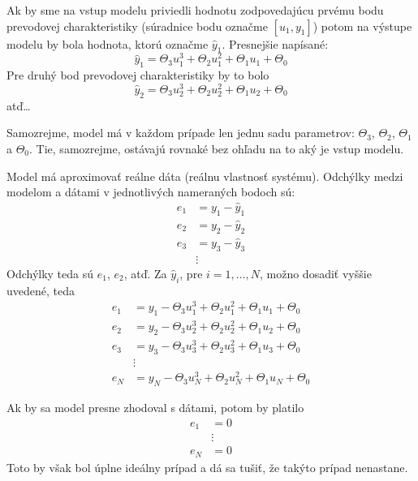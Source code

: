 \documentclass[a4paper, 10pt, ]{article}
\begin{document}
Ak by sme na vstup modelu priviedli hodnotu zodpovedajúcu prvému bodu prevodovej charakteristiky (súradnice bodu označme $[u_1, y_1]$) potom na výstupe modelu by bola hodnota, ktorú označme $\hat y_1$. Presnejšie napísané:
\begin{equation}
    \hat y_1 = \Theta_3 u_1^3 + \Theta_2 u_1^2 + \Theta_1 u_1 + \Theta_0
\end{equation}
Pre druhý bod prevodovej charakteristiky by to bolo
\begin{equation}
    \hat y_2 = \Theta_3 u_2^3 + \Theta_2 u_2^2 + \Theta_1 u_2 + \Theta_0
\end{equation}
atď\ldots

Samozrejme, model má v každom prípade len jednu sadu parametrov: $\Theta_3$, $\Theta_2$, $\Theta_1$ a $\Theta_0$. Tie, samozrejme, ostávajú rovnaké bez ohľadu na to aký je vstup modelu.




Model má aproximovať reálne dáta (reálnu vlastnosť systému). Odchýlky medzi modelom a dátami v jednotlivých nameraných bodoch sú:
\begin{subequations}
    \begin{align}
        e_1 &= y_1 - \hat y_1 \\
        e_2 &= y_2 - \hat y_2 \\
        e_3 &= y_3 - \hat y_3 \\
        &\vdots
    \end{align}
\end{subequations}
Odchýlky teda sú $e_1$, $e_2$, atď. Za $\hat y_i$, pre $i = 1,\ldots, N$, možno dosadiť vyššie uvedené, teda
\begin{subequations}
    \begin{align}
        e_1 &= y_1 - \Theta_3 u_1^3 + \Theta_2 u_1^2 + \Theta_1 u_1 + \Theta_0 \\
        e_2 &= y_2 - \Theta_3 u_2^3 + \Theta_2 u_2^2 + \Theta_1 u_2 + \Theta_0 \\
        e_3 &= y_3 - \Theta_3 u_3^3 + \Theta_2 u_3^2 + \Theta_1 u_3 + \Theta_0 \\
        &\vdots \\
        e_N &= y_N - \Theta_3 u_N^3 + \Theta_2 u_N^2 + \Theta_1 u_N + \Theta_0
    \end{align}
\end{subequations}

Ak by sa model presne zhodoval s dátami, potom by platilo
\begin{subequations}
    \begin{align}
        e_1 &= 0 \\
        &\vdots \\
        e_N &= 0
    \end{align}
\end{subequations}
Toto by však bol úplne ideálny prípad a dá sa tušiť, že takýto prípad nenastane.
\end{document}
